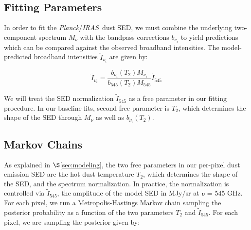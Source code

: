 \documentclass{emulateapj}
\newcommand{\IRAS}{{\it IRAS}}
\newcommand{\PLANCK}{{\it Planck}}
\begin{document}

\subsection{Fitting Parameters}
In order to fit the \PLANCK/\IRAS~dust SED, we must combine the underlying 
two-component spectrum $M_{\nu}$ with the bandpass corrections $b_{\nu_i}$ to 
yield predictions which can be compared against the observed broadband 
intensities. The model-predicted broadband intensities $\tilde{I}_{\nu_i}$ are 
given by:

\begin{equation}
\label{eqn:inten}
\tilde{I}_{\nu_i} = \frac{b_{\nu_i}(T_2)M_{\nu_i}}{b_{545}(T_2)M_{545}}\tilde{I}_{545}
\end{equation}

We will treat the SED normalization $\tilde{I}_{545}$ as a free parameter in
our fitting procedure. In our baseline fits, second free parameter is $T_2$, 
which determines the shape of the SED through $M_{\nu}$ as well as 
$b_{\nu_i}(T_2)$.




\subsection{Markov Chains}
As explained in $\S$\ref{sec:modeling}, the two free parameters in our 
per-pixel dust emission SED are the hot dust temperature $T_2$, which 
determines the shape of the SED, and the spectrum normalization. In practice,
the normalization is controlled via $\tilde{I}_{545}$, the amplitude of the 
model SED in MJy/sr at $\nu$ = 545 GHz. For each pixel, we run a 
Metropolis-Hastings Markov chain sampling the posterior probability as a 
function of the two parameters $T_2$ and $\tilde{I}_{545}$. For each pixel, we 
are sampling the posterior given by:

\end{document}
